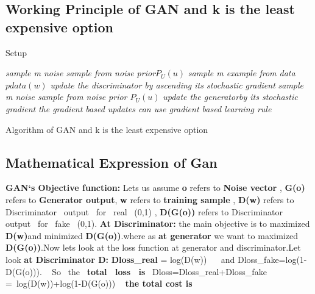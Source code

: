 \documentclass[runningheads]{llncs}
\begin{document}
{\subsection{Working Principle of GAN and k is the least expensive option}
\begin{algorithm*}[H]
\caption{Setup}
\label{algo:pre}
\begin{algorithmic}[1]
    
            \STATE \emph{sample m noise sample from noise prior{$P_U(u)$}}
            \STATE \emph{sample m example from data  {$pdata(w)$}}
            \STATE \emph{update the discriminator by ascending its stochastic gradient}
        \ENDFOR
        \STATE \emph{sample m noise sample from noise prior ${P_U(u)}$}
        \STATE \emph{update the generatorby its stochastic gradient}
    \ENDFOR
    \STATE \emph{the gradient based updates can use gradient based learning rule}

 \caption{Algorithm of GAN and k is the least expensive option}    
\end{algorithmic}
\end{algorithm*}

\hfill \break
\subsection{Mathematical Expression of Gan}
\textbf{GAN`s Objective function:}
\newline
\hfill \break
Lets us  assume \textbf{o} refers to \textbf{Noise vector} , \textbf{G(o)} refers to \textbf{Generator output},
\textbf{w} refers to \textbf{training sample} ,
\textbf{D(w)} refers to  Discriminator~ output~ for~ real ~(0,1) ,
\textbf{D(G(o))} refers to  Discriminator~ output~ for~ fake ~(0,1). 
\textbf{At Discriminator: }the main objective is to maximized
\textbf{D(w)}and minimized \textbf{D(G(o))}.where as \textbf{at generator} we want to maximized \textbf{D(G(o))}.Now lets look at the loss function at generator and discriminator.Let look \textbf{at Discriminator D:} \textbf{Dloss_{real}} = log(D(w)) ~~ and Dloss_{fake}=log(1-D(G(o))). ~ So ~the~ \textbf{total~ loss ~is}~ Dloss=Dloss_{real}+Dloss_{fake}~
=~log(D(w))+log(1-D(G(o))) ~ \textbf{the total cost is} 
\newline
    
}
\end{document}
